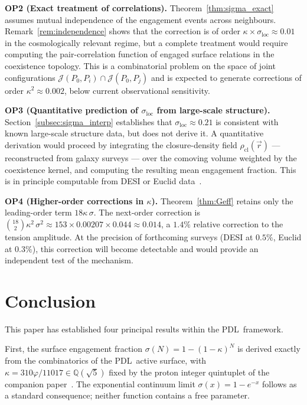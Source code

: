 \documentclass[11pt,a4paper]{article}
\theoremstyle{definition}
\newcommand{\PDL}{\textnormal{PDL}}
\newcommand{\vp}{\varphi}
\newcommand{\kap}{\kappa}
\newcommand{\sig}{\sigma}
\newcommand{\rhocl}{\rho_{\mathrm{cl}}}
\begin{document}
\medskip\noindent\textbf{OP2 (Exact treatment of correlations).} Theorem~\ref{thm:sigma_exact} assumes mutual independence of the engagement events across neighbours. Remark~\ref{rem:independence} shows that the correction is of order $\kap \times \sig_{\mathrm{loc}} \approx 0.01$ in the cosmologically relevant regime, but a complete treatment would require computing the pair-correlation function of engaged surface relations in the coexistence topology. This is a combinatorial problem on the space of joint configurations $\mathcal{J}(P_0, P_i) \cap \mathcal{J}(P_0, P_j)$ and is expected to generate corrections of order $\kap^2 \approx 0.002$, below current observational sensitivity.

\medskip\noindent\textbf{OP3 (Quantitative prediction of $\sig_{\mathrm{loc}}$ from large-scale structure).} Section~\ref{subsec:sigma_interp} establishes that $\sig_{\mathrm{loc}} \approx 0.21$ is consistent with known large-scale structure data, but does not derive it. A quantitative derivation would proceed by integrating the closure-density field $\rhocl(\vec{r})$ --- reconstructed from galaxy surveys --- over the comoving volume weighted by the coexistence kernel, and computing the resulting mean engagement fraction. This is in principle computable from DESI or Euclid data~\cite{DESI_2024,Euclid_2024}.

\medskip\noindent\textbf{OP4 (Higher-order corrections in $\kap$).} Theorem~\ref{thm:Geff} retains only the leading-order term $18\kap\,\sig$. The next-order correction is $\binom{18}{2}\kap^2\,\sig^2 \approx 153 \times 0.00207 \times 0.044 \approx 0.014$, a $1.4\%$ relative correction to the tension amplitude. At the precision of forthcoming surveys (DESI at $0.5\%$, Euclid at $0.3\%$), this correction will become detectable and would provide an independent test of the mechanism.

\section*{Conclusion}

This paper has established four principal results within the \PDL\ framework.

First, the surface engagement fraction $\sig(N) = 1-(1-\kap)^N$ is derived exactly from the combinatorics of the \PDL\ active surface, with $\kap = 310\vp/11017 \in \mathbb{Q}(\sqrt{5})$ fixed by the proton integer quintuplet of the companion paper~\cite{PDL_Bridge_2026}. The exponential continuum limit $\sig(x) = 1 - e^{-x}$ follows as a standard consequence; neither function contains a free parameter.
\end{document}
